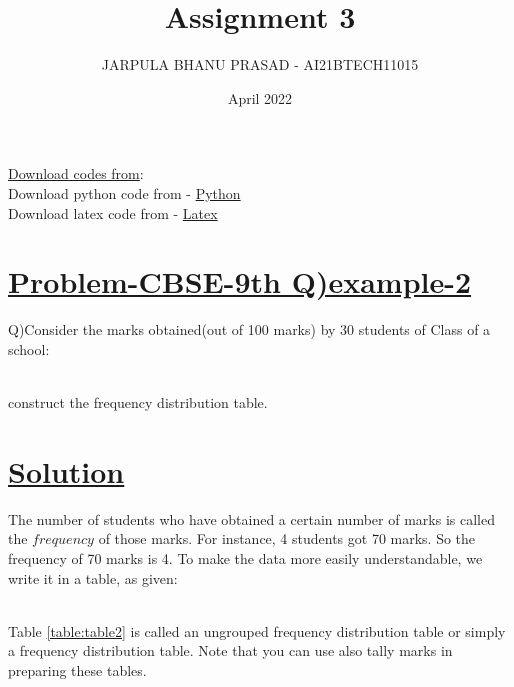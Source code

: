 \documentclass[journal,12pt,twocolumn]{IEEEtran}
\title{Assignment 3}
\author{JARPULA BHANU PRASAD - AI21BTECH11015}
\date{April 2022}
\begin{document}
\maketitle
\noindent \Large\underline{Download codes from}:\\
\noindent\large Download python code from - \href{https://github.com/jarpula-Bhanu/Assignment-3/blob/main/codes/fredat.py}{Python}\\ Download latex code from - \href{https://github.com/jarpula-Bhanu/Assignment-3/blob/main/Assignment3.tex}{Latex}

\section{\large\underline{Problem-CBSE-9th Q)example-2}}
\large \noindent Q)Consider the marks obtained(out of 100 marks) by 30 students of Class  of a school: 
\begin{table}[ht!]
\begin{center}
		
		\vspace*{5pt}
		\caption{}
		\label{table:table1}
\end{center}	
	\end{table}\\
construct the frequency distribution table.
\section{\large\underline{Solution}}
\noindent The number of students who have obtained a certain number of marks is called the $frequency$ of those marks. For instance, 4 students got 70 marks. So the frequency of 70 marks is 4. To make the data more easily understandable, we write it in a table, as given:
\begin{table}[ht!]
\begin{center}
		
		\vspace*{5pt}
		\caption{}
		\label{table:table2}	
\end{center}
\end{table}\\

\noindent Table \ref{table:table2} is called an ungrouped frequency distribution table or simply a frequency distribution table. Note that you can use also tally marks in preparing these tables.
\end{document}
